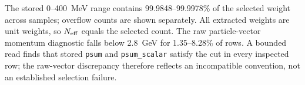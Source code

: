 The stored 0--400~MeV range contains 99.9848--99.9978\% of the selected weight across samples; overflow counts are shown separately. All extracted weights are unit weights, so $N_{\rm eff}$ equals the selected count. The raw particle-vector momentum diagnostic falls below 2.8~GeV for 1.35--8.28\% of rows. A bounded read finds that stored \texttt{psum} and \texttt{psum\_scalar} satisfy the cut in every inspected row; the raw-vector discrepancy therefore reflects an incompatible convention, not an established selection failure.
